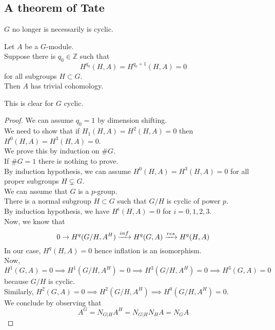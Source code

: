 \documentclass[../main.tex]{subfiles}
\begin{document}
\subsection{A theorem of Tate}
$G$ no longer is necessarily is cyclic.
\begin{thm}
	Let $A$ be a $G$-module.\\
	Suppose there is $q_0 \in \mathbb{Z}$ such that
	\[ 
	H^{q_0}( H, A) = H^{q_0+1}( H,A) =0
	\]
	for all subgroups $H \subset G$.\\
	Then $A$ has trivial cohomology.
\end{thm}
\begin{rmq}
This is clear for $G$ cyclic.
\end{rmq}
\begin{proof}
We can assume $q_0=1$ by dimension shifting.\\
We need to show that if $H_1( H,A) = H^{2}( H,A) =0$ then $H^{0}( H,A) = H^{3}( H,A) =0$.\\
We prove this by induction on $\# G$.\\
If $\# G=1$ there is nothing to prove.\\
By induction hypothesis, we can assume $H^{0}( H,A) = H^{3}( H,A) =0$ for all proper subgroups $H \subsetneq G$.\\
We can assume that $G$ is a $p$-group.\\
There is a normal subgroup $H \subset G$ such that $G /H$ is cyclic of power $p$.\\
By induction hypothesis, we have $H^{i}( H,A) =0$ for $i=0,1,2,3$.\\
Now, we know that
\[ 
	0 \to H^{q}( G /H , A^{H}) \xrightarrow{inf} H^{q}( G,A) \xrightarrow{res} H^{q}( H,A) 
\]
In our case, $H^{q}( H,A) =0$ hence inflation is an isomorphism.\\
Now, $H^{1}( G,A) =0\implies H^{1}( G /H, A^{H}) =0 \implies H^{3}( G /H, A^{H}) =0\implies H^{3}( G,A) =0$ because $G /H$ is cyclic.\\
Similarly, $H^{2}( G,A) =0 \implies H^{2}( G /H, A^{H}) \implies H^{0}( G /H, A^{H}) =0$.\\
We conclude by observing that
\[ 
A^{G}= N_{G |H} A^{H}= N_{G|H} N_H A= N_G A
\]

\end{proof}
\end{document}
